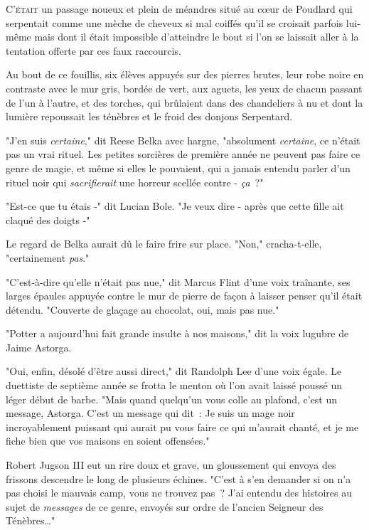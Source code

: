 
\lettrine{C}{'était} un passage noueux et plein de méandres situé au cœur de Poudlard qui serpentait comme une mèche de cheveux si mal coiffés qu'il se croisait parfois lui-même mais dont il était impossible d'atteindre le bout si l'on se laissait aller à la tentation offerte par ces faux raccourcis.

Au bout de ce fouillis, six élèves appuyés sur des pierres brutes, leur robe noire en contraste avec le mur gris, bordée de vert, aux aguets, les yeux de chacun passant de l'un à l'autre, et des torches, qui brûlaient dans des chandeliers à nu et dont la lumière repoussait les ténèbres et le froid des donjons Serpentard.

"J'en suis \emph{certaine}," dit Reese Belka avec hargne, "absolument \emph{certaine}, ce n'était pas un vrai rituel. Les petites sorcières de première année ne peuvent pas faire ce genre de magie, et même si elles le pouvaient, qui a jamais entendu parler d'un rituel noir qui \emph{sacrifierait} une horreur scellée contre - \emph{ça}~?"

"Est-ce que tu étais -" dit Lucian Bole. "Je veux dire - après que cette fille ait claqué des doigts -"

Le regard de Belka aurait dû le faire frire sur place. "Non," cracha-t-elle, "certainement \emph{pas}."

"C'est-à-dire qu'elle n'était pas nue," dit Marcus Flint d'une voix traînante, ses larges épaules appuyée contre le mur de pierre de façon à laisser penser qu'il était détendu. "Couverte de glaçage au chocolat, oui, mais pas nue."

"Potter a aujourd'hui fait grande insulte à nos maisons," dit la voix lugubre de Jaime Astorga.

"Oui, enfin, désolé d'être aussi direct," dit Randolph Lee d'une voix égale. Le duettiste de septième année se frotta le menton où l'on avait laissé poussé un léger début de barbe. "Mais quand quelqu'un vous colle au plafond, c'est un message, Astorga. C'est un message qui dit~: Je suis un mage noir incroyablement puissant qui aurait pu vous faire ce qui m'aurait chanté, et je me fiche bien que vos maisons en soient offensées."

Robert Jugson III eut un rire doux et grave, un gloussement qui envoya des frissons descendre le long de plusieurs échines. "C'est à s'en demander si on n'a pas choisi le mauvais camp, vous ne trouvez pas~? J'ai entendu des histoires au sujet de \emph{messages} de ce genre, envoyés sur ordre de l'ancien Seigneur des Ténèbres…"

